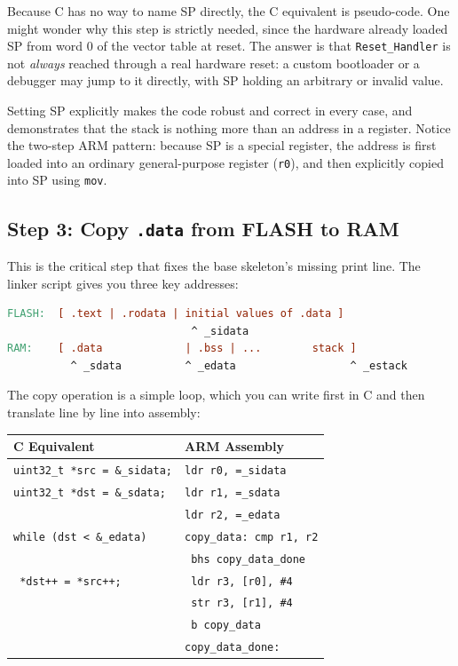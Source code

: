 Because C has no way to name SP directly, the C equivalent is pseudo-code. One might wonder why this step is strictly needed, since the hardware already loaded SP from word 0 of the vector table at reset. The answer is that \texttt{Reset\_Handler} is not \textit{always} reached through a real hardware reset: a custom bootloader or a debugger may jump to it directly, with SP holding an arbitrary or invalid value. 

Setting SP explicitly makes the code robust and correct in every case, and demonstrates that the stack is nothing more than an address in a register. Notice the two-step ARM pattern: because SP is a special register, the address is first loaded into an ordinary general-purpose register (\texttt{r0}), and then explicitly copied into SP using \texttt{mov}.

\subsection{Step 3: Copy \texttt{.data} from FLASH to RAM}
This is the critical step that fixes the base skeleton's missing print line. The linker script gives you three key addresses:

\begin{lstlisting}[language=make]
FLASH:  [ .text | .rodata | initial values of .data ]
                             ^ _sidata
RAM:    [ .data             | .bss | ...        stack ]
          ^ _sdata          ^ _edata                  ^ _estack
\end{lstlisting}

The copy operation is a simple loop, which you can write first in C and then translate line by line into assembly:

\begin{table}[h!]
\centering
\begin{tabular}{|l|l|}
\hline
\textbf{C Equivalent} & \textbf{ARM Assembly} \\ \hline
\texttt{uint32\_t *src = \&\_sidata;} & \texttt{ldr r0, =\_sidata} \\
\texttt{uint32\_t *dst = \&\_sdata;} & \texttt{ldr r1, =\_sdata} \\
\texttt{                      } & \texttt{ldr r2, =\_edata} \\ \hline
\texttt{while (dst < \&\_edata)} & \texttt{copy\_data: cmp r1, r2} \\
\texttt{                      } & \texttt{            bhs copy\_data\_done} \\ \hline
\texttt{    *dst++ = *src++;  } & \texttt{            ldr r3, [r0], \#4} \\
\texttt{                      } & \texttt{            str r3, [r1], \#4} \\
\texttt{                      } & \texttt{            b   copy\_data} \\ \hline
\texttt{                      } & \texttt{copy\_data\_done:} \\ \hline
\end{tabular}
\end{table}

